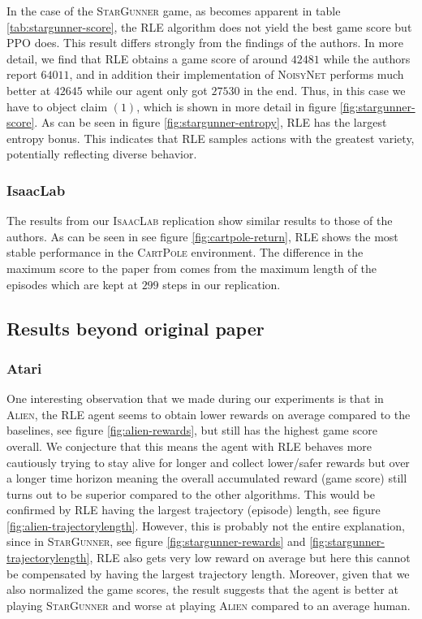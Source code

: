 \documentclass[10pt]{article} %
\begin{document}
\noindent In the case of the \textsc{StarGunner} game, as becomes apparent in table \ref{tab:stargunner-score}, the \textsc{RLE} algorithm does not yield the best game score but \textsc{PPO} does. This result differs strongly from the findings of the authors. In more detail, we find that \textsc{RLE} obtains a game score of around $42481$ while the authors report $64011$, and in addition their implementation of \textsc{NoisyNet} performs much better at $42645$ while our agent only got $27530$ in the end. Thus, in this case we have to object claim $(1)$, which is shown in more detail in figure \ref{fig:stargunner-score}. As can be seen in figure \ref{fig:stargunner-entropy}, \textsc{RLE} has the largest entropy bonus. This indicates that \textsc{RLE} samples actions with the greatest variety, potentially reflecting diverse behavior.

\subsubsection{IsaacLab}

The results from our \textsc{IsaacLab} replication show similar results to those of the authors. As can be seen in see figure \ref{fig:cartpole-return}, \textsc{RLE} shows the most stable performance in the \textsc{CartPole} environment. The difference in the maximum score to the paper from \cite{rle-paper} comes from the maximum length of the episodes which are kept at $299$ steps in our replication. 

\subsection{Results beyond original paper}

\subsubsection{Atari}

One interesting observation that we made during our experiments is that in \textsc{Alien}, the \textsc{RLE} agent seems to obtain lower rewards on average compared to the baselines, see figure \ref{fig:alien-rewards}, but still has the highest game score overall. We conjecture that this means the agent with \textsc{RLE} behaves more cautiously trying to stay alive for longer and collect lower/safer rewards but over a longer time horizon meaning the overall accumulated reward (game score) still turns out to be superior compared to the other algorithms. This would be confirmed by \textsc{RLE} having the largest trajectory (episode) length, see figure \ref{fig:alien-trajectorylength}. However, this is probably not the entire explanation, since in \textsc{StarGunner}, see figure \ref{fig:stargunner-rewards} and \ref{fig:stargunner-trajectorylength}, \textsc{RLE} also gets very low reward on average but here this cannot be compensated by having the largest trajectory length. Moreover, given that we also normalized the game scores, the result suggests that the agent is better at playing \textsc{StarGunner} and worse at playing \textsc{Alien} compared to an average human.
\end{document}
